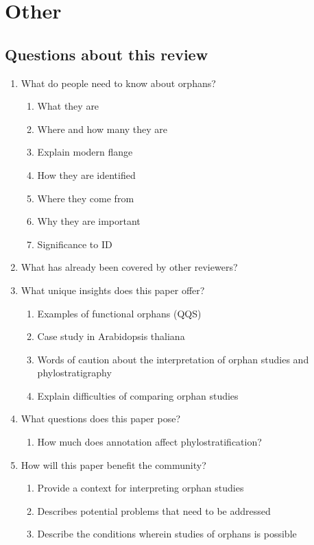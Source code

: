 \section{Other} 
\subsection{Questions about this review}

    \begin{enumerate} 
        \item What do people need to know
            about orphans?  
            \begin{enumerate} 
                \item What they are 
                \item Where and how many they are 
                \item Explain modern flange 
                \item How they are identified 
                \item Where they come from 
                \item Why they are important 
                \item Significance to ID 
            \end{enumerate} 
        \item What has already been covered by other reviewers?  
        \item What unique insights does this paper offer?  
        \begin{enumerate} 
            \item Examples of functional orphans (QQS) 
            \item Case study in Arabidopsis thaliana 
            \item Words of caution about the interpretation of orphan studies and
                phylostratigraphy 
            \item Explain difficulties of comparing orphan studies
                
        \end{enumerate} 
        \item What questions does this paper pose?
            \begin{enumerate} 
                \item How much does annotation affect phylostratification?  
            \end{enumerate} 
        \item How will this paper benefit the community?  
        \begin{enumerate} 
            \item Provide a context for interpreting orphan studies 
            \item Describes potential problems that need to be addressed 
            \item Describe the conditions wherein studies of orphans is possible 
        \end{enumerate} 
    \end{enumerate}

